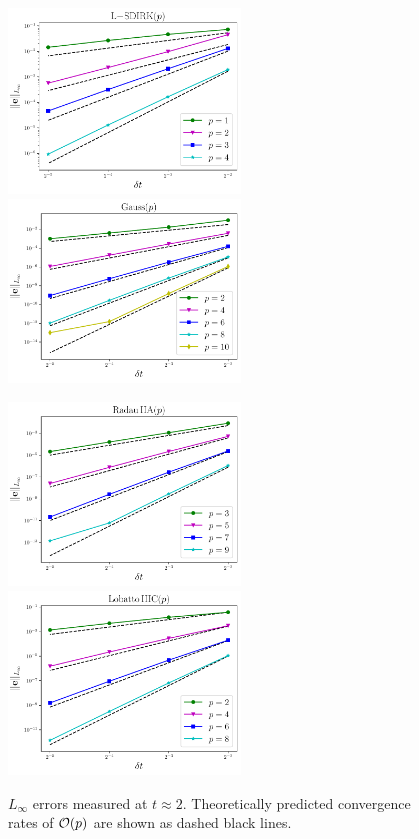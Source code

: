 \documentclass[review]{siamart}
\begin{document}
\begin{figure}[H]
\centerline{
\includegraphics[width = 0.55\textwidth]{figures/LSDIRK_d2_ex1.pdf}
\quad
\includegraphics[width = 0.55\textwidth]{figures/Gauss_d2_ex1.pdf}
}
\centerline{
\includegraphics[width = 0.55\textwidth]{figures/RadauIIA_d2_ex1.pdf}
\quad
\includegraphics[width = 0.55\textwidth]{figures/LobattoIIIC_d2_ex1.pdf}
}
\caption{$L_{\infty}$ errors measured at $t \approx 2$. Theoretically predicted convergence rates of ${\cal O}(p)$ are shown as dashed black lines.
\label{fig:errors2D}
}
\end{figure}
\end{document}
